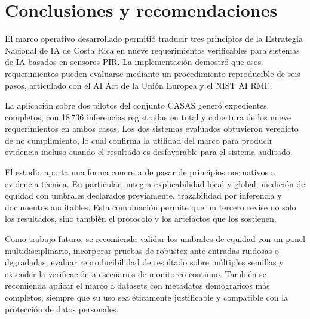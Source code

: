 
\section{Conclusiones y recomendaciones}

El marco operativo desarrollado permitió traducir tres principios de la
Estrategia Nacional de IA de Costa Rica en nueve requerimientos verificables
para sistemas de IA basados en sensores PIR. La implementación demostró que esos
requerimientos pueden evaluarse mediante un procedimiento reproducible de seis
pasos, articulado con el AI Act de la Unión Europea y el NIST AI RMF.

La aplicación sobre dos pilotos del conjunto CASAS generó expedientes
completos, con 18\,736 inferencias registradas en total y cobertura de los
nueve requerimientos en ambos casos. Los dos sistemas evaluados obtuvieron
veredicto de no cumplimiento, lo cual confirma la utilidad del marco para
producir evidencia incluso cuando el resultado es desfavorable para el sistema
auditado.

El estudio aporta una forma concreta de pasar de principios normativos a
evidencia técnica. En particular, integra explicabilidad local y global,
medición de equidad con umbrales declarados previamente, trazabilidad por
inferencia y documentos auditables. Esta combinación permite que un tercero
revise no solo los resultados, sino también el protocolo y los artefactos que
los sostienen.

Como trabajo futuro, se recomienda validar los umbrales de equidad con un panel
multidisciplinario, incorporar pruebas de robustez ante entradas ruidosas o
degradadas, evaluar reproducibilidad de resultado sobre múltiples semillas y
extender la verificación a escenarios de monitoreo continuo. También se
recomienda aplicar el marco a datasets con metadatos demográficos más
completos, siempre que su uso sea éticamente justificable y compatible con la
protección de datos personales.
